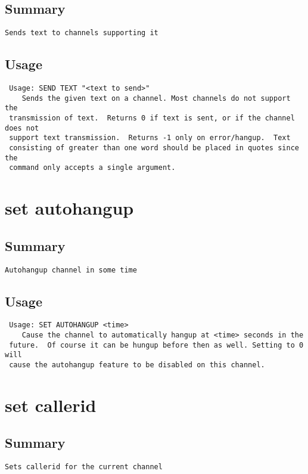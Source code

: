 \subsection{Summary}
\begin{verbatim}
Sends text to channels supporting it
\end{verbatim}
\subsection{Usage}
\begin{verbatim}
 Usage: SEND TEXT "<text to send>"
	Sends the given text on a channel. Most channels do not support the
 transmission of text.  Returns 0 if text is sent, or if the channel does not
 support text transmission.  Returns -1 only on error/hangup.  Text
 consisting of greater than one word should be placed in quotes since the
 command only accepts a single argument.

\end{verbatim}


\section{set autohangup}
\subsection{Summary}
\begin{verbatim}
Autohangup channel in some time
\end{verbatim}
\subsection{Usage}
\begin{verbatim}
 Usage: SET AUTOHANGUP <time>
	Cause the channel to automatically hangup at <time> seconds in the
 future.  Of course it can be hungup before then as well. Setting to 0 will
 cause the autohangup feature to be disabled on this channel.

\end{verbatim}


\section{set callerid}
\subsection{Summary}
\begin{verbatim}
Sets callerid for the current channel
\end{verbatim}
